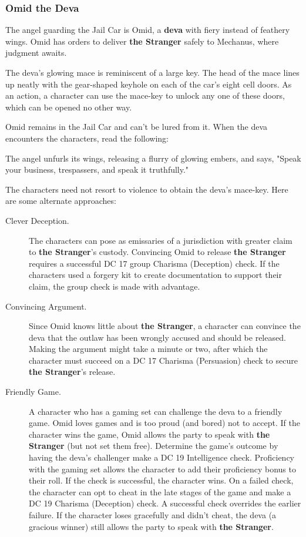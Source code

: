 \documentclass[10pt,a4paper,twoside,bg=print,twocolumn,openany,nodeprecatedcode]{dndbook}
\begin{document}
\subsubsection{Omid the Deva}
The angel guarding the Jail Car is Omid, a \textbf{deva} with fiery instead of feathery wings. Omid has orders to deliver \textbf{the Stranger} safely to Mechanus, where judgment awaits.

The deva's glowing mace is reminiscent of a large key. The head of the mace lines up neatly with the gear-shaped keyhole on each of the car's eight cell doors. As an action, a character can use the mace-key to unlock any one of these doors, which can be opened no other way.

Omid remains in the Jail Car and can't be lured from it. When the deva encounters the characters, read the following:

\begin{DndReadAloud}{}
The angel unfurls its wings, releasing a flurry of glowing embers, and says, "Speak your business, trespassers, and speak it truthfully."

\end{DndReadAloud}

The characters need not resort to violence to obtain the deva's mace-key. Here are some alternate approaches:


\begin{description}
\item[Clever Deception.]
The characters can pose as emissaries of a jurisdiction with greater claim to \textbf{the Stranger}'s custody. Convincing Omid to release \textbf{the Stranger} requires a successful DC 17 group Charisma (Deception) check. If the characters used a forgery kit to create documentation to support their claim, the group check is made with advantage.
\item[Convincing Argument.]
Since Omid knows little about \textbf{the Stranger}, a character can convince the deva that the outlaw has been wrongly accused and should be released. Making the argument might take a minute or two, after which the character must succeed on a DC 17 Charisma (Persuasion) check to secure \textbf{the Stranger}'s release.
\item[Friendly Game.]
A character who has a gaming set can challenge the deva to a friendly game. Omid loves games and is too proud (and bored) not to accept. If the character wins the game, Omid allows the party to speak with \textbf{the Stranger} (but not set them free). Determine the game's outcome by having the deva's challenger make a DC 19 Intelligence check. Proficiency with the gaming set allows the character to add their proficiency bonus to their roll. If the check is successful, the character wins. On a failed check, the character can opt to cheat in the late stages of the game and make a DC 19 Charisma (Deception) check. A successful check overrides the earlier failure. If the character loses gracefully and didn't cheat, the deva (a gracious winner) still allows the party to speak with \textbf{the Stranger}.
\end{description}
\end{document}
